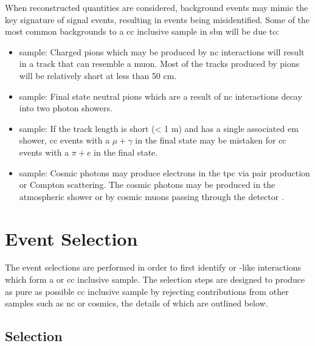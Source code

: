 When reconstructed quantities are considered, background events may mimic the key signature of signal events, resulting in events being misidentified. Some of the most common backgrounds to a \gls{cc} inclusive sample in \gls{sbn} will be due to: 

\begin{itemize}
    \item \numu sample: Charged pions which may be produced by \gls{nc} interactions will result in a track that can resemble a muon. Most of the tracks produced by pions will be relatively short at less than 50 cm. 
    
    \item \nue sample: Final state neutral pions which are a result of \gls{nc} interactions decay into two photon showers. 
    \item \nue sample: If the track length is short (< 1 m) and has a single associated \gls{em} shower, \numu \gls{cc} events with a $\mu + \gamma$ in the final state may be mistaken for \nue \gls{cc} events with a $\pi + e$ in the final state.
    \item \nue sample: Cosmic photons may produce electrons in the \gls{tpc} via pair production or Compton scattering. The cosmic photons may be produced in the atmospheric shower or by cosmic muons passing through the detector \cite{SBN_Proposal}. 
\end{itemize}

\section{Event Selection}\label{sec:event_selection}


The event selections are performed in order to first identify \numu or \nue-like interactions which form a \numu or \nue \gls{cc} inclusive sample. The selection steps are designed to produce as pure as possible \gls{cc} inclusive sample by rejecting contributions from other samples such as \gls{nc} or cosmics, the details of which are outlined below. 

\subsection{\texorpdfstring{\numu Selection}{numu Selection}}\label{sec:numu_selection}


